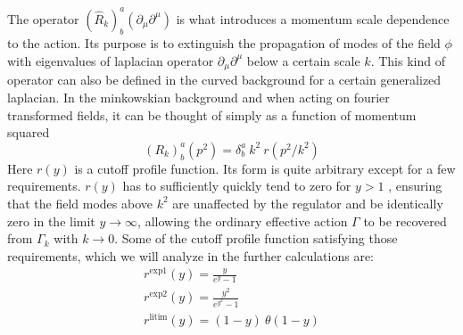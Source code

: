 \documentclass[11pt, a4paper]{article}
\begin{document}
The operator $(\hat{R}_k)^a_b (\partial_{\mu}\partial^{\mu})$ is what introduces a momentum scale dependence to the action.
Its purpose is to extinguish the propagation of modes of the field $\phi$ with eigenvalues of laplacian operator $\partial_\mu \partial^\mu$ below a certain scale $k$.
This kind of operator can also be defined in the curved background for a certain generalized laplacian. In the minkowskian background and when acting on fourier transformed fields, it can be thought of simply as a function of momentum squared
\begin{equation}
    (R_k)^a_b (p^2) = 
    \delta^a_b \ k^2 \ r\left(p^2 / k^2 \right)
\end{equation}
Here $r(y)$ is a cutoff profile function. Its form is quite arbitrary except for a few requirements.
$r(y)$ has to sufficiently quickly tend to zero for $y>1$
, ensuring that the field modes above $k^2$ are unaffected by the regulator
and be identically zero in the limit $y\rightarrow \infty$, allowing the ordinary effective action $\Gamma$ to be recovered from $\Gamma_k$ with $k\rightarrow 0$.
Some of the cutoff profile function satisfying those requirements, which we will analyze in the further calculations are: 
\begin{gather}
    r^{\text{exp1}}(y) = \frac{y}{e^{y} - 1}\\
    r^{\text{exp2}}(y) = \frac{y^2}{e^{y^2} - 1}\\
    r^{\text{litim}}(y) = (1-y) \ \theta \left(1-y\right)
    \label{litim}
\end{gather}



\end{document}
